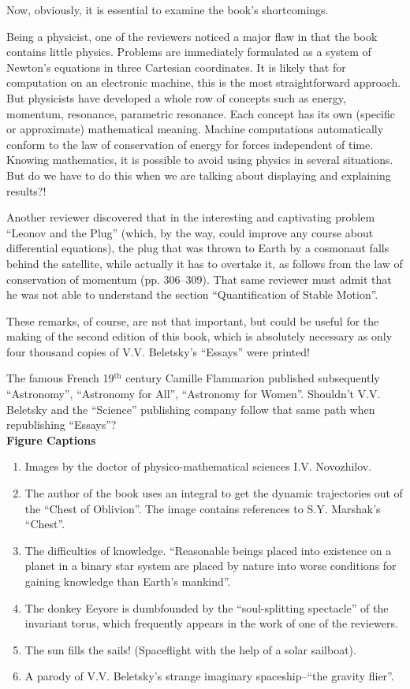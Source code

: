 \documentclass[12pt]{amsart}
\begin{document}
Now, obviously, it is essential to examine the book's shortcomings.

Being a physicist, one of the reviewers noticed a major flaw in that the book
contains little physics.
Problems are immediately formulated as a system of Newton's equations in three
Cartesian coordinates.
It is likely that for computation on an electronic machine, this is the most
straightforward approach.
But physicists have developed a whole row of concepts such as energy, momentum,
resonance, parametric resonance.
Each concept has its own (specific or approximate) mathematical meaning.
Machine computations automatically conform to the law of conservation of energy
for forces independent of time.
Knowing mathematics, it is possible to avoid using physics in several
situations.
But do we have to do this when we are talking about displaying and explaining
results?!

Another reviewer discovered that in the interesting and captivating problem
``Leonov and the Plug'' (which, by the way, could improve any course about
differential equations), the plug that was thrown to Earth by a cosmonaut falls
behind the satellite, while actually it has to overtake it, as follows from the
law of conservation of momentum (pp. 306--309).
That same reviewer must admit that he was not able to understand the section
``Quantification of Stable Motion''.

These remarks, of course, are not that important, but could be useful for the
making of the second edition of this book, which is absolutely necessary as only
four thousand copies of V.V. Beletsky's ``Essays'' were printed!

The famous French 19$^\text{th}$ century Camille Flammarion published
subsequently ``Astronomy'', ``Astronomy for All'', ``Astronomy for Women''.
Shouldn't V.V. Beletsky and the ``Science'' publishing company follow that same
path when republishing ``Essays''?\\

\textbf{Figure Captions}
\begin{enumerate}
\item
Images by the doctor of physico-mathematical sciences I.V. Novozhilov.
\item
The author of the book uses an integral to get the dynamic trajectories out of
the ``Chest of Oblivion''.
The image contains references to S.Y. Marshak's ``Chest''.
\item
The difficulties of knowledge.
``Reasonable beings placed into existence on a planet in a binary star system
are placed by nature into worse conditions for gaining knowledge than Earth's
mankind''.
\item
The donkey Eeyore is dumbfounded by the ``soul-splitting spectacle'' of the
invariant torus, which frequently appears in the work of one of the reviewers.
\item
The sun fills the sails!
(Spaceflight with the help of a solar sailboat).
\item
A parody of V.V. Beletsky's strange imaginary spaceship--``the gravity flier''.
\end{enumerate}
\end{document}
